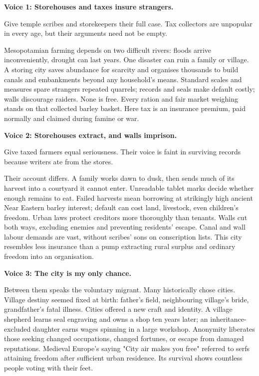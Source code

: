 \textbf{Voice 1: Storehouses and taxes insure strangers.}

Give temple scribes and storekeepers their full case. Tax collectors are unpopular in every age, but their arguments need not be empty.

Mesopotamian farming depends on two difficult rivers: floods arrive inconveniently, drought can last years. One disaster can ruin a family or village. A storing city saves abundance for scarcity and organises thousands to build canals and embankments beyond any household's means. Standard scales and measures spare strangers repeated quarrels; records and seals make default costly; walls discourage raiders. None is free. Every ration and fair market weighing stands on that collected barley basket. Here tax is an insurance premium, paid normally and claimed during famine or war.

\textbf{Voice 2: Storehouses extract, and walls imprison.}

Give taxed farmers equal seriousness. Their voice is faint in surviving records because writers ate from the stores.

Their account differs. A family works dawn to dusk, then sends much of its harvest into a courtyard it cannot enter. Unreadable tablet marks decide whether enough remains to eat. Failed harvests mean borrowing at strikingly high ancient Near Eastern barley interest; default can cost land, livestock, even children's freedom. Urban laws protect creditors more thoroughly than tenants. Walls cut both ways, excluding enemies and preventing residents' escape. Canal and wall labour demands are vast, without scribes' sons on conscription lists. This city resembles less insurance than a pump extracting rural surplus and ordinary freedom into an organisation.

\textbf{Voice 3: The city is my only chance.}

Between them speaks the voluntary migrant. Many historically chose cities. Village destiny seemed fixed at birth: father's field, neighbouring village's bride, grandfather's fatal illness. Cities offered a new craft and identity. A village shepherd learns seal engraving and owns a shop ten years later; an inheritance-excluded daughter earns wages spinning in a large workshop. Anonymity liberates those seeking changed occupations, changed fortunes, or escape from damaged reputations. Medieval Europe's saying "City air makes you free" referred to serfs attaining freedom after sufficient urban residence. Its survival shows countless people voting with their feet.

